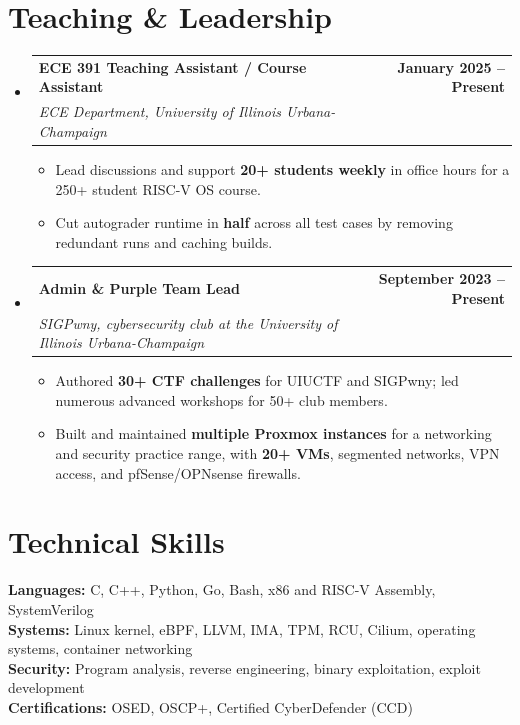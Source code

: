 \documentclass[letterpaper,11pt]{article}
\makeatletter
\newcommand{\resumeItem}[1]{
  \item\small{#1 \vspace{-2pt}}
}
\newcommand{\resumeSubheading}[4]{
  \vspace{-2pt}\item
    \begin{tabular*}{1.0\textwidth}[t]{l@{\extracolsep{\fill}}r}
      \textbf{#1} & \textbf{\small #2} \\
      \textit{\small #3} & \textit{\small #4} \\
    \end{tabular*}\vspace{-7pt}
}
\newcommand{\resumeSubHeadingListStart}{\begin{itemize}[leftmargin=0in,label={}]}
\newcommand{\resumeSubHeadingListEnd}{\end{itemize}}
\newcommand{\resumeItemListStart}{\begin{itemize}}
\newcommand{\resumeItemListEnd}{\end{itemize}\vspace{-5pt}}
\makeatother
\begin{document}
\section{Teaching \& Leadership}
\resumeSubHeadingListStart
  \resumeSubheading
    {ECE 391 Teaching Assistant / Course Assistant}{January 2025 -- Present}
    {ECE Department, University of Illinois Urbana-Champaign}{}
  \resumeItemListStart
    \resumeItem{Lead discussions and support \textbf{20+ students weekly} in office hours for a 250+ student RISC-V OS course.}
    \resumeItem{Cut autograder runtime in \textbf{half} across all test cases by removing redundant runs and caching builds.}
  \resumeItemListEnd

  \resumeSubheading
    {Admin \& Purple Team Lead}{September 2023 -- Present}
    {SIGPwny, cybersecurity club at the University of Illinois Urbana-Champaign}{}
  \resumeItemListStart
    \resumeItem{Authored \textbf{30+ CTF challenges} for UIUCTF and SIGPwny; led numerous advanced workshops for 50+ club members.}
    \resumeItem{Built and maintained \textbf{multiple Proxmox instances} for a networking and security practice range, with \textbf{20+ VMs}, segmented networks, VPN access, and pfSense/OPNsense firewalls.}
  \resumeItemListEnd
\resumeSubHeadingListEnd

\section{Technical Skills}
\begin{itemize}[leftmargin=0.15in,label={}]
  \small{\item{
    \textbf{Languages:} C, C++, Python, Go, Bash, x86 and RISC-V Assembly, SystemVerilog \\
    \textbf{Systems:} Linux kernel, eBPF, LLVM, IMA, TPM, RCU, Cilium, operating systems, container networking \\
    \textbf{Security:} Program analysis, reverse engineering, binary exploitation, exploit development \\
    \textbf{Certifications:} OSED, OSCP+, Certified CyberDefender (CCD)
  }}
\end{itemize}
\vspace{-16pt}
\end{document}
